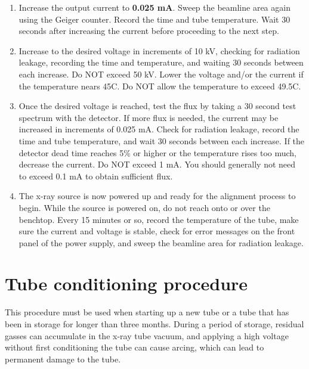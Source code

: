 \begin{enumerate}
\item Increase the output current to \textbf{0.025 mA}. Sweep the beamline area again using the Geiger counter.  Record the time and tube temperature. Wait 30 seconds after increasing the current before proceeding to the next step.

\item Increase to the desired voltage in increments of 10 kV, checking for radiation leakage, recording the time and temperature, and waiting 30 seconds between each increase. Do NOT exceed 50 kV.  Lower the voltage and/or the current if the temperature nears 45C. Do NOT allow the temperature to exceed 49.5C.

\item Once the desired voltage is reached, test the flux by taking a 30 second test spectrum with the detector. If more flux is needed, the current may be increased in increments of 0.025 mA. Check for radiation leakage, record the time and tube temperature, and wait 30 seconds between each increase.  If the detector dead time reaches 5\% or higher or the temperature rises too much, decrease the current. Do NOT exceed 1 mA.  You should generally not need to exceed 0.1 mA to obtain sufficient flux.\label{item:finish}

\item The x-ray source is now powered up and ready for the alignment process to begin. While the source is powered on, do not reach onto or over the benchtop. Every 15 minutes or so, record the temperature of the tube, make sure the current and voltage is stable, check for error messages on the front panel of the power supply, and sweep the beamline area for radiation leakage.

\end{enumerate}

\section{Tube conditioning procedure\label{sec:conditioning}}

This procedure must be used when starting up a new tube or a tube that has been in storage for longer than three months. During a period of storage, residual gasses can accumulate in the x-ray tube vacuum, and applying a high voltage without first conditioning the tube can cause arcing, which can lead to permanent damage to the tube.

